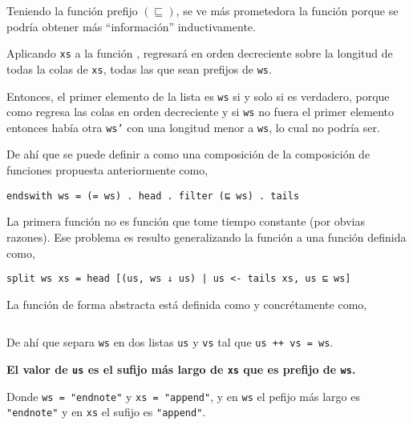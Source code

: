 Teniendo la función prefijo $(\sqsubseteq)$, se ve más prometedora la función
 porque se podría obtener más ``información'' inductivamente.

Aplicando \texttt{xs} a la función , regresará en orden decreciente
sobre la longitud de todas la colas de \texttt{xs}, todas las que sean prefijos de \texttt{ws}.


Entonces, el primer elemento de la lista es \texttt{ws} si y solo si  es
verdadero, porque como  regresa las colas en orden decreciente y si \texttt{ws} no 
fuera el primer elemento entonces había otra \texttt{ws'} con una longitud menor a \texttt{ws}, lo
cual no podría ser.

De ahí que se puede definir a  como una composición de la composición de funciones
 propuesta anteriormente como,

\begin{verbatim}
endswith ws = (= ws) . head . filter (⊑ ws) . tails
\end{verbatim}

La primera función  no es función que tome tiempo constante (por obvias razones). 
Ese problema es resulto generalizando la función  a una función
 definida como,

\begin{verbatim}
split ws xs = head [(us, ws ↓ us) | us <- tails xs, us ⊑ ws]
\end{verbatim}

La función  de forma abstracta está definida como  y
concrétamente como,

\inputminted{haskell}{definiciones/kmp/1-down-arrow.hs}

De ahí que  separa \texttt{ws} en dos listas \texttt{us} y \texttt{vs} tal que
\texttt{us ++ vs = ws}.

\begin{center}
\textbf{El valor de \texttt{us} es el sufijo más largo de \texttt{xs} que es prefijo de \texttt{ws}.}
\end{center}

Donde \texttt{ws = "{}endnote"} y \texttt{xs = "{}append"}, y en \texttt{ws} el pefijo más largo
es \texttt{"\color{purple}{}end\color{black}note"} y en \texttt{xs} el sufijo es
\texttt{"{}app\color{purple}end\color{black}"}.

